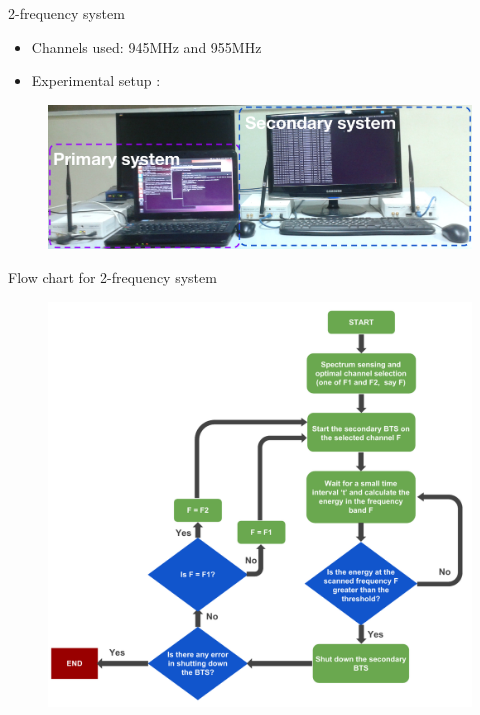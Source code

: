 \documentclass{beamer}
\begin{document}
  
  
  
  
  \begin{frame}{2-frequency system}
    \begin{itemize}
      \item Channels used: 945MHz and 955MHz
      \item Experimental setup :
    \end{itemize}
    \begin{figure}
      \centering
      \includegraphics[width=0.97\linewidth]{img/freq2}
    \end{figure}
  \end{frame}
  
  \begin{frame}{Flow chart for 2-frequency system}
    \begin{figure}
      \centering
      \includegraphics[height=0.9\textheight]{img/freqSys2}
    \end{figure}
  \end{frame}
\end{document}
